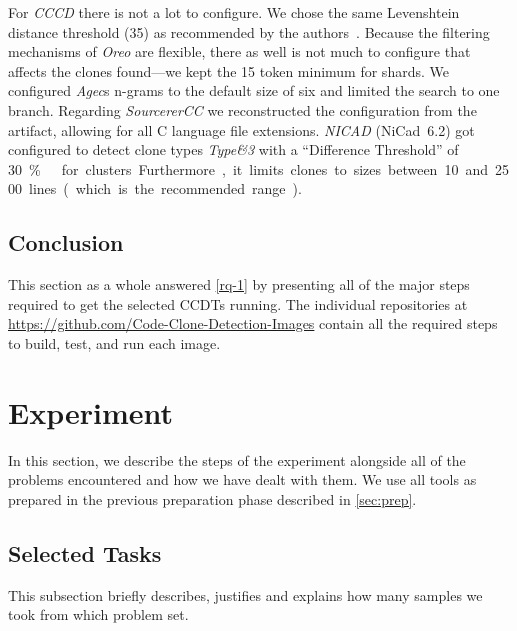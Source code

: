 \documentclass[10pt,journal,compsoc]{IEEEtran}
\def\T#1{\textsl{Type\nobreakdash-#1}}
\newcommand*\urldate[2]{\url{#1}\;\textsuperscript{\color{gray}\DTMdate{#2}}}
\begin{document}
For \textsl{CCCD} there is not a lot to configure. We chose the same Levenshtein distance threshold (35) as recommended by the authors~\cite{6671332}. Because the filtering mechanisms of \textsl{Oreo} are flexible, there as well is not much to configure that affects the clones found---we kept the 15 token minimum for shards.
We configured \textsl{Agec}s n-grams to the default size of six and limited the search to one branch.
Regarding \textsl{SourcererCC} we reconstructed the configuration from the artifact, allowing for all C language file extensions.
\textsl{NICAD} (NiCad~6.2) got configured to detect clone types \T{2\&3} with a \enquote{Difference Threshold} of \qty{30}\percent\ for clusters. Furthermore, it limits clones to sizes between 10 and 2500 lines (which is the recommended range).


\subsection{Conclusion}
This section as a whole answered \ref{rq-1} by presenting all of the major steps required to get the selected CCDTs running. The individual repositories at \urldate{https://github.com/Code-Clone-Detection-Images}{2022-02-13} contain all the required steps to build, test, and run each image.

\section{Experiment}\label{sec:exp}
In this section, we describe the steps of the experiment alongside all of the problems encountered and how we have dealt with them. We use all tools as prepared in the previous preparation phase described in \cref{sec:prep}.

\subsection{Selected Tasks}
\label{subsec:selected-task}This subsection briefly describes, justifies and explains how many samples we took from which problem set.
\end{document}
